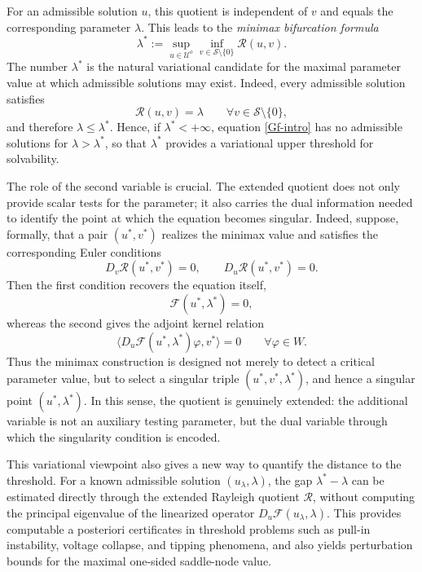 \documentclass[preprint,10pt]{elsarticle}
\numberwithin{equation}{section}
\begin{document}
For an admissible solution \(u\), this quotient is independent of \(v\) and
equals the corresponding parameter \(\lambda\). This leads to the \emph{minimax
bifurcation formula}
\begin{equation}
	\label{MainB}
	\lambda^*
	:=
	\sup_{u\in\mathcal U^o}
	\inf_{v\in\mathcal S\setminus\{0\}}
	\mathcal R(u,v).
\end{equation}
The number \(\lambda^*\) is the natural variational candidate for the maximal
parameter value at which admissible solutions may exist. Indeed, every
admissible solution satisfies
\[
\mathcal R(u,v)=\lambda
\qquad
\forall v\in\mathcal S\setminus\{0\},
\]
and therefore \(\lambda\le\lambda^*\). Hence, if \(\lambda^*<+\infty\),
equation \eqref{Gf-intro} has no admissible solutions for
\(\lambda>\lambda^*\), so that \(\lambda^*\) provides a variational upper
threshold for solvability.

The role of the second variable is crucial. The extended quotient does not
only provide scalar tests for the parameter; it also carries the dual
information needed to identify the point at which the equation becomes
singular. Indeed, suppose, formally, that a pair \((u^*,v^*)\) realizes the
minimax value and satisfies the corresponding Euler conditions
\[
D_v\mathcal R(u^*,v^*)=0,
\qquad
D_u\mathcal R(u^*,v^*)=0 .
\]
Then the first condition recovers the equation itself,
\[
\mathcal F(u^*,\lambda^*)=0,
\]
whereas the second gives the adjoint kernel relation
\[
\big\langle
D_u\mathcal F(u^*,\lambda^*)\varphi,
v^*
\big\rangle=0
\qquad
\forall \varphi\in W .
\]
Thus the minimax construction is designed not merely to detect a critical
parameter value, but to select a singular triple
\((u^*,v^*,\lambda^*)\), and hence a singular point
\((u^*,\lambda^*)\). In this sense, the quotient is genuinely extended: the
additional variable is not an auxiliary testing parameter, but the dual
variable through which the singularity condition is encoded.

This variational viewpoint also gives a new way to quantify the distance to
the threshold. For a known admissible solution \((u_\lambda,\lambda)\), the
gap \(\lambda^*-\lambda\) can be estimated directly through the extended
Rayleigh quotient \(\mathcal R\), without computing the principal eigenvalue
of the linearized operator \(D_u\mathcal F(u_\lambda,\lambda)\). This
provides computable a posteriori certificates in threshold problems such as
pull-in instability, voltage collapse, and tipping phenomena, and also yields
perturbation bounds for the maximal one-sided saddle-node value.
\end{document}
